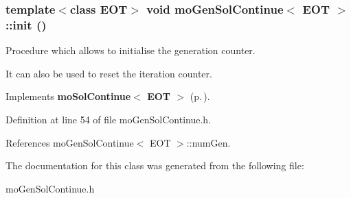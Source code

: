 \subsubsection{\setlength{\rightskip}{0pt plus 5cm}template$<$class EOT$>$ void {\bf mo\-Gen\-Sol\-Continue}$<$ EOT $>$::init ()\hspace{0.3cm}{\tt  [inline, virtual]}}\label{classmo_gen_sol_continue_6c5db8182157584b56507cc9075602d4}


Procedure which allows to initialise the generation counter. 

It can also be used to reset the iteration counter. 

Implements {\bf mo\-Sol\-Continue$<$ EOT $>$} {\rm (p.\,\pageref{classmo_sol_continue_064dc966a210f4ffb9515be3f03ca4c7})}.

Definition at line 54 of file mo\-Gen\-Sol\-Continue.h.

References mo\-Gen\-Sol\-Continue$<$ EOT $>$::num\-Gen.

The documentation for this class was generated from the following file:\begin{CompactItemize}
\item 
mo\-Gen\-Sol\-Continue.h\end{CompactItemize}
